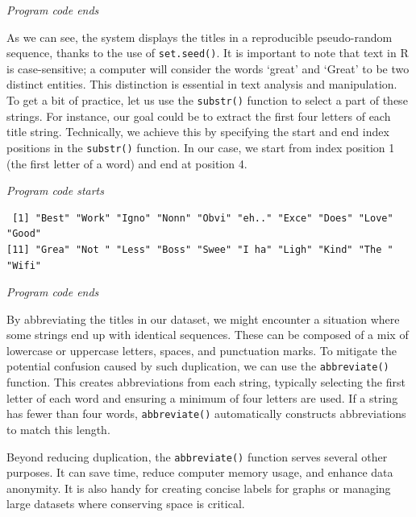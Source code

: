 \emph{Program code ends}

As we can see, the system displays the titles in a reproducible
pseudo-random sequence, thanks to the use of \texttt{set.seed()}. It is
important to note that text in R is case-sensitive; a computer will consider 
the words `great' and `Great' to be two distinct entities. This
distinction is essential in text analysis and manipulation. To get a bit
of practice, let us use the \texttt{substr()} function to select a part
of these strings. For instance, our goal could be to extract the first
four letters of each title string. Technically, we achieve this by
specifying the start and end index positions in the \texttt{substr()}
function. In our case, we start from index position 1 (the first
letter of a word) and end at position 4.

\emph{Program code starts}

\begin{Shaded}
\begin{Highlighting}[]
 \NormalTok{, } \NormalTok{)}
\end{Highlighting}
\end{Shaded}

\begin{verbatim}
 [1] "Best" "Work" "Igno" "Nonn" "Obvi" "eh.." "Exce" "Does" "Love" "Good"
[11] "Grea" "Not " "Less" "Boss" "Swee" "I ha" "Ligh" "Kind" "The " "Wifi"
\end{verbatim}

\emph{Program code ends}

By abbreviating the titles in our dataset, we might encounter a
situation where some strings end up with identical sequences. These can be composed of a mix of lowercase or uppercase letters,
spaces, and punctuation marks. To mitigate the potential confusion
caused by such duplication, we can use the \texttt{abbreviate()}
function. This creates abbreviations from each string,
typically selecting the first letter of each word and ensuring a minimum
of four letters are used. If a string has fewer than four words,
\texttt{abbreviate()} automatically constructs abbreviations to match this
length.

Beyond reducing duplication, the \texttt{abbreviate()} function serves
several other purposes. It can save time, reduce computer memory usage,
and enhance data anonymity. It is also handy for creating concise labels
for graphs or managing large datasets where conserving space is critical.

